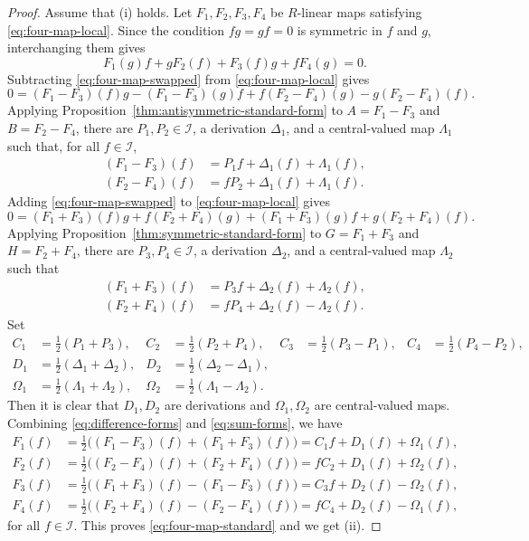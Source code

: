 \documentclass[10pt,a4paper]{amsart}
\newcommand{\I}{\mathcal I}
\begin{document}
\begin{proof}
Assume that (i) holds. Let $F_1,F_2,F_3,F_4$ be $R$-linear maps satisfying
\eqref{eq:four-map-local}. Since the condition $fg=gf=0$ is
symmetric in $f$ and $g$, interchanging them gives
\begin{equation}\label{eq:four-map-swapped}
F_1(g)f+gF_2(f)+F_3(f)g+fF_4(g)=0.
\end{equation}
Subtracting \eqref{eq:four-map-swapped} from \eqref{eq:four-map-local} gives
$$0=(F_1-F_3)(f)g-(F_1-F_3)(g)f+f(F_2-F_4)(g)-g(F_2-F_4)(f).$$
Applying Proposition~\ref{thm:antisymmetric-standard-form} to
$A=F_1-F_3$ and $B=F_2-F_4$, there are $P_1,P_2\in\I$, a derivation $\Delta_1$, and a
central-valued map $\Lambda_1$ such that, for all $f\in\I$,
\begin{equation}\label{eq:difference-forms}
\begin{aligned}
(F_1-F_3)(f)&=P_1f+\Delta_1(f)+\Lambda_1(f),\\
(F_2-F_4)(f)&=fP_2+\Delta_1(f)+\Lambda_1(f).
\end{aligned}
\end{equation}
Adding \eqref{eq:four-map-swapped} to \eqref{eq:four-map-local} gives
$$0=(F_1+F_3)(f)g+f(F_2+F_4)(g)+(F_1+F_3)(g)f+g(F_2+F_4)(f).$$
Applying Proposition~\ref{thm:symmetric-standard-form} to
$G=F_1+F_3$ and $H=F_2+F_4$, there are $P_3,P_4\in\I$, a derivation $\Delta_2$, and a
central-valued map $\Lambda_2$ such that
\begin{equation}\label{eq:sum-forms}
\begin{aligned}
(F_1+F_3)(f)&=P_3f+\Delta_2(f)+\Lambda_2(f),\\
(F_2+F_4)(f)&=fP_4+\Delta_2(f)-\Lambda_2(f).
\end{aligned}
\end{equation}
Set
\[
\begin{aligned}
C_1&=\tfrac12(P_1+P_3),&
C_2&=\tfrac12(P_2+P_4),&
C_3&=\tfrac12(P_3-P_1),&
C_4&=\tfrac12(P_4-P_2),\\
D_1&=\tfrac12(\Delta_1+\Delta_2),&
D_2&=\tfrac12(\Delta_2-\Delta_1),\\
\Omega_1&=\tfrac12(\Lambda_1+\Lambda_2),&
\Omega_2&=\tfrac12(\Lambda_1-\Lambda_2).
\end{aligned}
\]
Then it is clear that $D_1,D_2$ are derivations and $\Omega_1,\Omega_2$ are central-valued maps.
Combining \eqref{eq:difference-forms} and \eqref{eq:sum-forms}, we have
\[
\begin{aligned}
F_1(f)
&=\frac12\bigl((F_1-F_3)(f)+(F_1+F_3)(f)\bigr)=C_1f+D_1(f)+\Omega_1(f),\\
F_2(f)
&=\frac12\bigl((F_2-F_4)(f)+(F_2+F_4)(f)\bigr)=fC_2+D_1(f)+\Omega_2(f),\\
F_3(f)
&=\frac12\bigl((F_1+F_3)(f)-(F_1-F_3)(f)\bigr)=C_3f+D_2(f)-\Omega_2(f),\\
F_4(f)
&=\frac12\bigl((F_2+F_4)(f)-(F_2-F_4)(f)\bigr)=fC_4+D_2(f)-\Omega_1(f),
\end{aligned}
\]
for all $f\in\I$. This proves \eqref{eq:four-map-standard} and we get (ii).


\end{proof}
\end{document}
